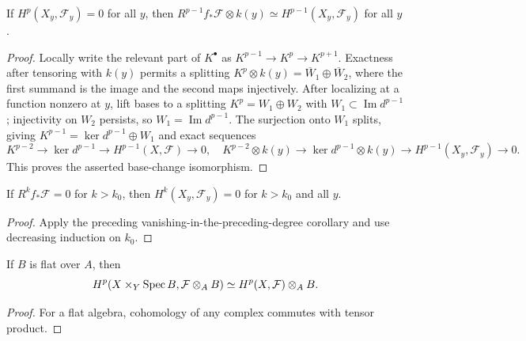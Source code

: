 \begin{corollary}
\label{mumford-source-base-change-vanishing}
If $H^p(X_y,\mathcal F_y)=0$ for all $y$, then
$R^{p-1}f_*\mathcal F\otimes k(y)\simeq H^{p-1}(X_y,\mathcal F_y)$ for all $y$.
\end{corollary}
\begin{proof}
Locally write the relevant part of $K^\bullet$ as
$K^{p-1}\to K^p\to K^{p+1}$. Exactness after tensoring with $k(y)$ permits
a splitting $K^p\otimes k(y)=\overline W_1\oplus\overline W_2$, where the
first summand is the image and the second maps injectively. After localizing
at a function nonzero at $y$, lift bases to a splitting $K^p=W_1\oplus W_2$
with $W_1\subset\operatorname{Im}d^{p-1}$; injectivity on $W_2$ persists,
so $W_1=\operatorname{Im}d^{p-1}$. The surjection onto $W_1$ splits, giving
$K^{p-1}=\ker d^{p-1}\oplus W_1$ and exact sequences
\[
 K^{p-2}\to\ker d^{p-1}\to H^{p-1}(X,\mathcal F)\to0,
\quad
 K^{p-2}\otimes k(y)\to\ker d^{p-1}\otimes k(y)\to
 H^{p-1}(X_y,\mathcal F_y)\to0.
\]
This proves the asserted base-change isomorphism.
\end{proof}

\begin{corollary}
\label{mumford-source-higher-vanishing}
If $R^kf_*\mathcal F=0$ for $k>k_0$, then $H^k(X_y,\mathcal F_y)=0$ for
$k>k_0$ and all $y$.
\end{corollary}
\begin{proof}
Apply the preceding vanishing-in-the-preceding-degree corollary and use
decreasing induction on $k_0$.
\end{proof}

\begin{corollary}
\label{mumford-cor-flat-base-change}
If $B$ is flat over $A$, then
\[
 H^p(X\times_Y\operatorname{Spec} B,\mathcal F\otimes_A B)\simeq H^p(X,\mathcal F)\otimes_A B.
\]
\end{corollary}
\begin{proof}
For a flat algebra, cohomology of any complex commutes with tensor product.
\end{proof}

